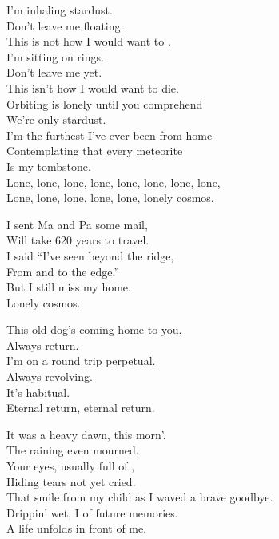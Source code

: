 
I'm inhaling stardust. \\
Don't leave me floating. \\
This is not how I would want to . \\
I'm sitting on  rings. \\

Don't leave me yet. \\
This isn't how I would want to die. \\
Orbiting is lonely until you comprehend \\
We're only stardust. \\
I'm the furthest I've ever been from home \\
Contemplating that every meteorite \\
Is my tombstone. \\

Lone, lone, lone, lone, lone, lone, lone, lone, \\
Lone, lone, lone, lone, lone, lonely cosmos. \\


I sent Ma and Pa some mail, \\
Will take 620 years to travel. \\
I said ``I've seen beyond the ridge, \\
From  and to the edge.'' \\
But I still miss my home. \\
Lonely cosmos. \\





This old dog's coming home to you. \\
Always return. \\
I'm on a round trip perpetual. \\
Always revolving. \\
It's habitual. \\
Eternal return, eternal return. \\


It was a heavy dawn, this morn'. \\
The raining  even mourned. \\
Your eyes, usually full of , \\
Hiding tears not yet cried. \\
That smile from my child as I waved a brave goodbye. \\
Drippin' wet, I  of future memories. \\
A life unfolds in front of me. \\

